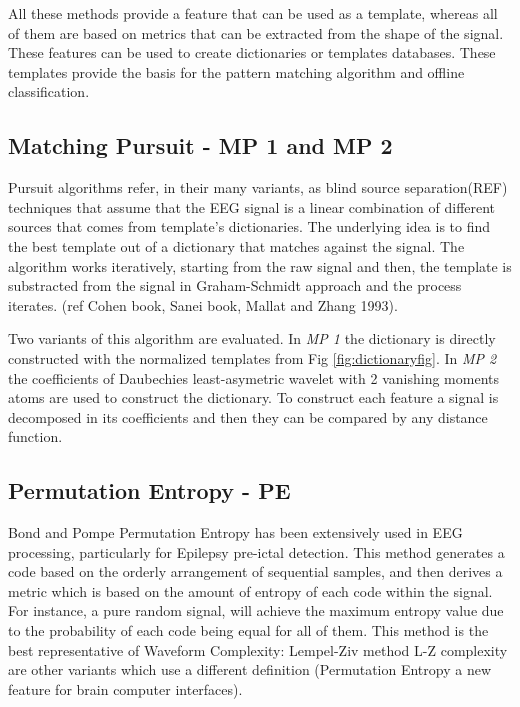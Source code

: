 \documentclass[sensors,article,submit,moreauthors,pdftex,10pt,a4paper]{mdpi}
\begin{document}
All these methods provide a feature that can be used as a template, whereas all of them are based on metrics that can be extracted from the shape of the signal.  These features can be used to create dictionaries or templates databases.  These templates provide the basis for the pattern matching algorithm and offline classification.

\subsection{Matching Pursuit - MP 1 and MP 2}

Pursuit algorithms refer, in their many variants, as blind source separation(REF) techniques that assume that the EEG signal is a linear combination of different sources that comes from template's dictionaries.  The underlying idea is to find the best template out of a dictionary that matches against the signal.  The algorithm works iteratively, starting from the raw signal and then, the template is substracted from the signal in Graham-Schmidt approach and the process iterates. (ref Cohen book, Sanei book, Mallat and Zhang 1993).

Two variants of this algorithm are evaluated. In \textit{MP 1} the dictionary is directly constructed with the normalized templates from Fig \ref{fig:dictionaryfig}.  In \textit{MP 2} the coefficients of  Daubechies least-asymetric wavelet with 2 vanishing moments atoms are used to construct the dictionary.  To construct each feature a signal is decomposed in its coefficients and then they can be compared by any distance function.


\subsection{Permutation Entropy - PE}

Bond and Pompe Permutation Entropy has been extensively used in EEG processing, particularly for Epilepsy pre-ictal detection.  This method generates a code based on the orderly arrangement of sequential samples, and then derives a metric which is based on the amount of entropy of each code within the signal.   For instance, a pure random signal, will achieve the maximum entropy value due to the probability of each code being equal for all of them. This method is the best representative of Waveform Complexity: Lempel-Ziv method L-Z complexity are other variants which use a different definition (Permutation Entropy a new feature for brain computer interfaces).
\end{document}
